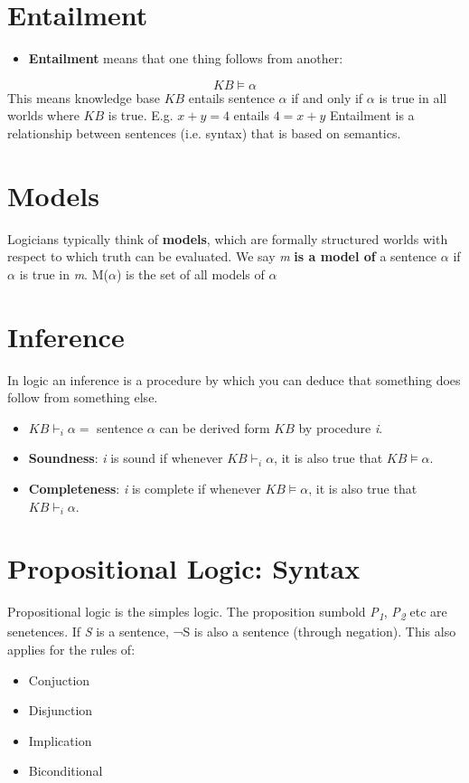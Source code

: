 \documentclass[11pt]{article}
\begin{document}
\section{Entailment}
\label{sec:org34b83f8}
\begin{itemize}
\item \textbf{Entailment} means that one thing follows from another:
\end{itemize}
\begin{equation}
KB \models \alpha
\end{equation}
This means knowledge base \(KB\) entails sentence \(\alpha\) if and only if \(\alpha\) is true in all worlds where \(KB\) is true.
E.g. \(x + y = 4\) entails \(4 = x + y\)
Entailment is a relationship between sentences (i.e. syntax) that is based on semantics.

\section{Models}
\label{sec:org54e56c1}
Logicians typically think of \textbf{models}, which are formally structured worlds with respect to which truth can be evaluated.
We say \emph{m} \textbf{is a model of} a sentence \(\alpha\) if \(\alpha\) is true in \emph{m}.
M(\(\alpha\)) is the set of all models of \(\alpha\)

\section{Inference}
\label{sec:orgb6ce7cf}
In logic an inference is a procedure by which you can deduce that something does follow from something else.
\begin{itemize}
\item \(KB \vdash_i \alpha =\) sentence \(\alpha\) can be derived form \(KB\) by procedure \emph{i}.
\item \textbf{Soundness}: \emph{i} is sound if whenever \(KB \vdash_i \alpha\), it is also true that \(KB \models \alpha\).
\item \textbf{Completeness}: \emph{i} is complete if whenever \(KB \models \alpha\), it is also true that \(KB \vdash_i \alpha\).
\end{itemize}

\section{Propositional Logic: Syntax}
\label{sec:orgfc5d0b1}
Propositional logic is the simples logic.
The proposition sumbold \emph{P\textsubscript{1}}, \emph{P\textsubscript{2}} etc are senetences.
If \emph{S} is a sentence, ¬S is also a sentence (through negation).
This also applies for the rules of:
\begin{itemize}
\item Conjuction
\item Disjunction
\item Implication
\item Biconditional
\end{itemize}
\end{document}
